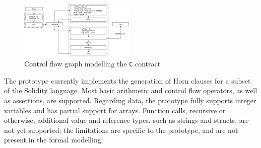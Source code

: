 \begin{figure}[h]
	\centering
	\includegraphics[width=0.49\textwidth]{images/contract-c}
	\caption{Control flow graph modelling the \texttt{C} contract}
	\label{fig:cfg_contract-c}
\end{figure}

The prototype currently implements the generation of Horn clauses for a subset of the Solidity language. Most basic arithmetic and control flow operators, as well as assertions, are supported. Regarding data, the prototype fully supports integer variables and has partial support for arrays. Function calls, recursive or otherwise, additional value and reference types, such as strings and structs, are not yet supported; the limitations are specific to the prototype, and are not present in the formal modelling.




